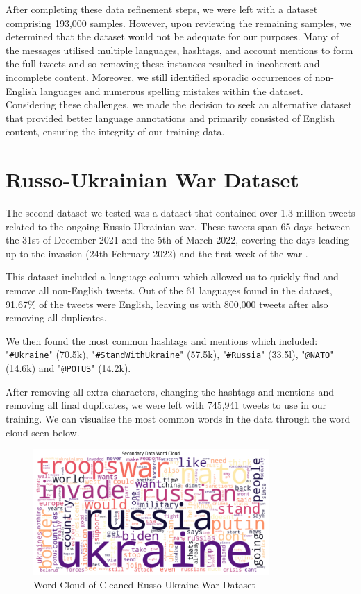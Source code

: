 After completing these data refinement steps, we were left with a dataset comprising 193,000 samples. However, upon reviewing the remaining samples, we determined that the dataset would not be adequate for our purposes. Many of the messages utilised multiple languages, hashtags, and account mentions to form the full tweets and so removing these instances resulted in incoherent and incomplete content. Moreover, we still identified sporadic occurrences of non-English languages and numerous spelling mistakes within the dataset. Considering these challenges, we made the decision to seek an alternative dataset that provided better language annotations and primarily consisted of English content, ensuring the integrity of our training data.


\section{Russo-Ukrainian War Dataset}

The second dataset we tested was a dataset that contained over 1.3 million tweets related to the ongoing Russio-Ukrainian war. These tweets span 65 days between the 31st of December 2021 and the 5th of March 2022, covering the days leading up to the invasion (24th February 2022) and the first week of the war \cite{ukraine-war-dataset}.

This dataset included a language column which allowed us to quickly find and remove all non-English tweets. Out of the 61 languages found in the dataset, 91.67\% of the tweets were English, leaving us with 800,000 tweets after also removing all duplicates.

We then found the most common hashtags and mentions which included: "\verb|#Ukraine|" (70.5k), "\verb|#StandWithUkraine|" (57.5k), "\verb|#Russia|" (33.5l), "\verb|@NATO|" (14.6k) and "\verb|@POTUS|" (14.2k).

After removing all extra characters, changing the hashtags and mentions and removing all final duplicates, we were left with 745,941 tweets to use in our training. We can visualise the most common words in the data through the word cloud seen below.

\begin{figure}[H]
    \centering
    \includegraphics[width=0.8\textwidth]{graphs/word_cloud.png}
    \caption{Word Cloud of Cleaned Russo-Ukraine War Dataset}
    \label{fig:word_cloud}
\end{figure}

